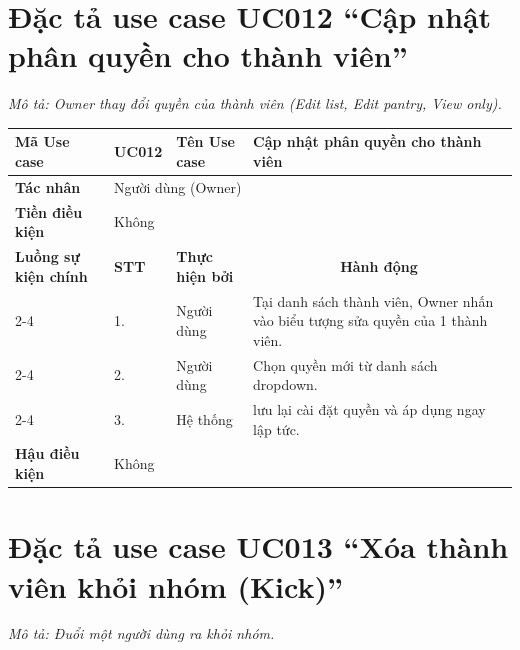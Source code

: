 \section{Đặc tả use case UC012 ``Cập nhật phân quyền cho thành viên''}
\textit{Mô tả: Owner thay đổi quyền của thành viên (Edit list, Edit pantry, View only).}
\vspace{0.5cm}

\begingroup
\renewcommand{\arraystretch}{1.5}

\begin{longtable}{|p{2.7cm}|p{0.8cm}|p{2.6cm}|p{7.3cm}|}
\hline
\cellcolor[HTML]{D5F5E3}\textbf{Mã Use case} & \multicolumn{1}{l|}{UC012} & \cellcolor[HTML]{D5F5E3}\textbf{Tên Use case} & Cập nhật phân quyền cho thành viên \\ \hline
\cellcolor[HTML]{D5F5E3}\textbf{Tác nhân} & \multicolumn{3}{p{10.7cm}|}{Người dùng (Owner)} \\ \hline
\cellcolor[HTML]{D5F5E3}\textbf{Tiền điều kiện} & \multicolumn{3}{p{10.7cm}|}{Không} \\ \hline

\cellcolor[HTML]{D5F5E3}\textbf{Luồng sự kiện chính} & \cellcolor[HTML]{FDEBD0}\textbf{STT} & \cellcolor[HTML]{FDEBD0}\textbf{Thực hiện bởi} & \multicolumn{1}{c|}{\cellcolor[HTML]{FDEBD0}\textbf{Hành động}} \\ \cline{2-4} 
\cellcolor[HTML]{D5F5E3} & 1. & Người dùng & Tại danh sách thành viên, Owner nhấn vào biểu tượng sửa quyền của 1 thành viên. \\ \cline{2-4} 
\cellcolor[HTML]{D5F5E3} & 2. & Người dùng & Chọn quyền mới từ danh sách dropdown. \\ \cline{2-4} 
\cellcolor[HTML]{D5F5E3} & 3. & Hệ thống & lưu lại cài đặt quyền và áp dụng ngay lập tức. \\ \hline

\cellcolor[HTML]{D5F5E3}\textbf{Hậu điều kiện} & \multicolumn{3}{p{10.7cm}|}{Không} \\ \hline
\end{longtable}
\endgroup

\section{Đặc tả use case UC013 ``Xóa thành viên khỏi nhóm (Kick)''}
\textit{Mô tả: Đuổi một người dùng ra khỏi nhóm.}
\vspace{0.5cm}

